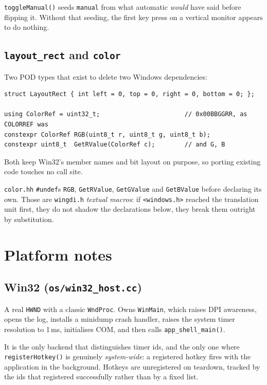 \documentclass[11pt,a4paper]{article}
\begin{document}
\texttt{toggleManual()} seeds \texttt{manual} from what automatic \emph{would}
have said before flipping it. Without that seeding, the first key press on a
vertical monitor appears to do nothing.

\subsection{\texttt{layout\_rect} and \texttt{color}}

Two POD types that exist to delete two Windows dependencies:

\begin{lstlisting}
struct LayoutRect { int left = 0, top = 0, right = 0, bottom = 0; };

using ColorRef = uint32_t;                       // 0x00BBGGRR, as COLORREF was
constexpr ColorRef RGB(uint8_t r, uint8_t g, uint8_t b);
constexpr uint8_t  GetRValue(ColorRef c);        // and G, B
\end{lstlisting}

Both keep Win32's member names and bit layout on purpose, so porting existing
code touches no call site.

\texttt{color.hh} \texttt{\#undef}s \texttt{RGB}, \texttt{GetRValue},
\texttt{GetGValue} and \texttt{GetBValue} before declaring its own. Those are
\texttt{wingdi.h} \emph{textual macros}: if \texttt{<windows.h>} reached the
translation unit first, they do not shadow the declarations below, they break
them outright by substitution.

\section{Platform notes}

\subsection{Win32 (\texttt{os/win32\_host.cc})}

A real \texttt{HWND} with a classic \texttt{WndProc}. Owns \texttt{WinMain},
which raises DPI awareness, opens the log, installs a minidump crash handler,
raises the system timer resolution to 1\,ms, initialises COM, and then calls
\texttt{app\_shell\_main()}.

It is the only backend that distinguishes timer ids, and the only one where
\texttt{registerHotkey()} is genuinely \emph{system-wide}: a registered hotkey
fires with the application in the background. Hotkeys are unregistered on
teardown, tracked by the ids that registered successfully rather than by a
fixed list.
\end{document}
